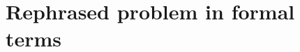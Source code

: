 \documentclass[a4paper, 12pt, notitlepage]{report}
\begin{document}
\section{Rephrased problem in formal terms}





\end{document}
